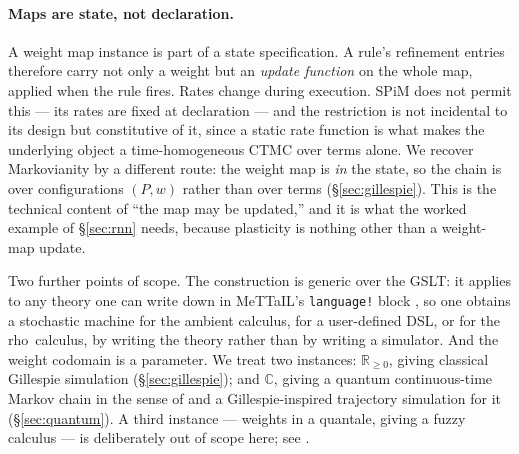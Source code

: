 \documentclass[11pt,a4paper]{article}
\theoremstyle{plain}
\theoremstyle{definition}
\theoremstyle{remark}
\newcommand{\rhoc}{\textsf{rho}}
\newcommand{\Rnn}{\mathbb{R}_{\geq 0}}
\newcommand{\Cx}{\mathbb{C}}
\newcommand{\wmap}{w}
\begin{document}
\paragraph{Maps are state, not declaration.} A weight map instance is part of a state
specification. A rule's refinement entries therefore carry not only a weight but an \emph{update
function} on the whole map, applied when the rule fires. Rates change during execution. SPiM does
not permit this --- its rates are fixed at declaration --- and the restriction is not incidental to
its design but constitutive of it, since a static rate function is what makes the underlying object
a time-homogeneous CTMC over terms alone. We recover Markovianity by a different route: the weight
map is \emph{in} the state, so the chain is over configurations $(P, \wmap)$ rather than over terms
(\S\ref{sec:gillespie}). This is the technical content of ``the map may be updated,'' and it is what
the worked example of \S\ref{sec:rnn} needs, because plasticity is nothing other than a weight-map
update.

Two further points of scope. The construction is generic over the GSLT: it applies to any theory
one can write down in MeTTaIL's \texttt{language!} block \cite{mettail}, so one obtains a stochastic
machine for the ambient calculus, for a user-defined DSL, or for the \rhoc\ calculus, by writing the
theory rather than by writing a simulator. And the weight codomain is a parameter. We treat two
instances: $\Rnn$, giving classical Gillespie simulation (\S\ref{sec:gillespie}); and $\Cx$, giving
a quantum continuous-time Markov chain in the sense of \cite{qctmc} and a Gillespie-inspired
trajectory simulation for it (\S\ref{sec:quantum}). A third instance --- weights in a quantale,
giving a fuzzy calculus --- is deliberately out of scope here; see \cite{fuzzy}.
\end{document}

